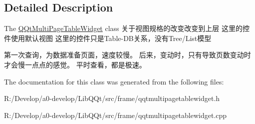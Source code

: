 \subsection{Detailed Description}
The \mbox{\hyperlink{class_q_qt_multi_page_table_widget}{Q\+Qt\+Multi\+Page\+Table\+Widget}} class 关于视图规格的改变改变到上层 这里的控件使用默认视图 这里的控件只是\+Table-\/\+D\+B关系，没有\+Tree/\+List模型 

第一次查询，为数据准备页面，速度较慢。 后来，变动时，只有导致页数变动时才会慢一点点的感觉。 平时查看，都是极速。 

The documentation for this class was generated from the following files\+:\begin{DoxyCompactItemize}
\item 
R\+:/\+Develop/a0-\/develop/\+Lib\+Q\+Qt/src/frame/qqtmultipagetablewidget.\+h\item 
R\+:/\+Develop/a0-\/develop/\+Lib\+Q\+Qt/src/frame/qqtmultipagetablewidget.\+cpp\end{DoxyCompactItemize}

